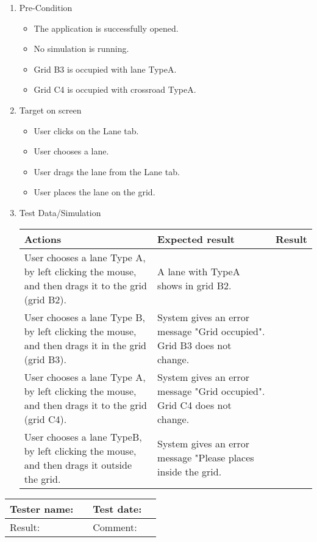 \begin{enumerate}
	\item Pre-Condition
	\begin{itemize}
		\item The application is successfully opened.
		\item No simulation is running.
		\item Grid B3 is occupied with lane TypeA.
		\item Grid C4 is occupied with crossroad TypeA.
	\end{itemize}
	\item Target on screen
	\begin{itemize}
		\item User clicks on the Lane tab.
		\item User chooses a lane.
		\item User drags the lane from the Lane tab.
		\item User places the lane on the grid.
	\end{itemize}
	\item Test Data/Simulation
	
	\begin{tabularx}{\textwidth}{|X|X|p{2.5cm}|}\hline
		Actions & Expected result & Result \\\hline
		User chooses a lane Type A, by left clicking the mouse, and then drags it to the grid (grid B2). & A lane with TypeA shows in grid B2. & \pass \\\hline
		User chooses a lane Type B, by left clicking the mouse, and then drags it in the grid (grid B3). & System gives an  error message "Grid occupied". Grid B3 does not change. & \pass\\\hline
		User chooses a lane Type A, by left clicking the mouse, and then drags it to the grid (grid C4). & System gives an  error message "Grid occupied". Grid C4 does not change. & \pass\\\hline
		User chooses a lane TypeB, by left clicking the mouse, and then drags it outside the grid. & System gives an error message "Please places inside the grid. & \pass\\\hline
	\end{tabularx}
\end{enumerate}

\begin{tabularx}{\textwidth}{|p{3cm}X|p{3cm}X|}\hline
	Tester name: &  & Test date: & \\\hline
	Result: &  \pass  & Comment: & \\\hline
\end{tabularx}

